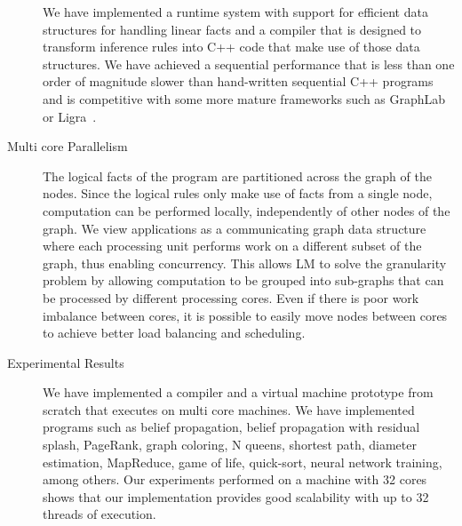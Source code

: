 \begin{description}
   We have implemented a runtime system with support for efficient data
   structures for handling linear facts and a compiler that is designed to
   transform inference rules into C++ code that make use of those data
   structures. We have achieved a sequential performance that is less than one
   order of magnitude slower than hand-written sequential C++ programs and is
   competitive with some more mature frameworks such as
   GraphLab~\cite{GraphLab2010} or Ligra~\cite{Shun:2013:LLG:2517327.2442530}.

   \item[Multi core Parallelism]
   
   The logical facts of the program are partitioned across the graph of the
   nodes. Since the logical rules only make use of facts from a single node,
   computation can be performed locally, independently of other nodes of the
   graph. We view applications as a communicating graph data structure where
   each processing unit performs work on a different subset of the graph, thus
   enabling concurrency. This allows LM to solve the granularity problem by
   allowing computation to be grouped into sub-graphs that can be processed by
   different processing cores. Even if there is poor work imbalance between
   cores, it is possible to easily move nodes between cores to achieve better
   load balancing and scheduling.

   \item[Experimental Results]

   We have implemented a compiler and a virtual machine prototype from scratch
   that executes on multi core machines.  We have implemented programs such as
   belief propagation, belief propagation with residual splash, PageRank, graph
   coloring, N queens, shortest path, diameter estimation, MapReduce, game of
   life, quick-sort, neural network training, among others. Our experiments
   performed on a machine with 32 cores shows that our implementation provides
   good scalability with up to 32 threads of execution.
      
\end{description}
